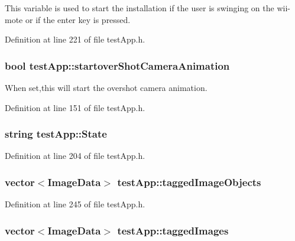 This variable is used to start the installation if the user is swinging on the wii-\/mote or if the enter key is pressed. 



Definition at line 221 of file test\-App.\-h.

\hypertarget{classtest_app_ad2fca6ce5e37462cd820afc48633324d}{
\subsubsection[{startover\-Shot\-Camera\-Animation}]{\setlength{\rightskip}{0pt plus 5cm}bool test\-App\-::startover\-Shot\-Camera\-Animation}}\label{classtest_app_ad2fca6ce5e37462cd820afc48633324d}


When set,this will start the overshot camera animation. 



Definition at line 151 of file test\-App.\-h.

\hypertarget{classtest_app_a8ce5505df4526abed238956b65956edd}{
\subsubsection[{State}]{\setlength{\rightskip}{0pt plus 5cm}string test\-App\-::\-State}}\label{classtest_app_a8ce5505df4526abed238956b65956edd}


Definition at line 204 of file test\-App.\-h.

\hypertarget{classtest_app_af65c8dc2f4620bfe7fdf6a39043cb48d}{
\subsubsection[{tagged\-Image\-Objects}]{\setlength{\rightskip}{0pt plus 5cm}vector$<${\bf Image\-Data}$>$ test\-App\-::tagged\-Image\-Objects}}\label{classtest_app_af65c8dc2f4620bfe7fdf6a39043cb48d}


Definition at line 245 of file test\-App.\-h.

\hypertarget{classtest_app_a7f7226fc54fdb7d06366ed0fa3ab7ee3}{
\subsubsection[{tagged\-Images}]{\setlength{\rightskip}{0pt plus 5cm}vector$<${\bf Image\-Data}$>$ test\-App\-::tagged\-Images}}\label{classtest_app_a7f7226fc54fdb7d06366ed0fa3ab7ee3}


